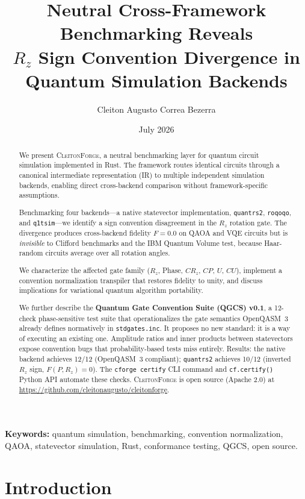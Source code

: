 \documentclass[11pt,a4paper]{article}
\title{\textbf{Neutral Cross-Framework Benchmarking Reveals\\
       $R_z$ Sign Convention Divergence in Quantum Simulation Backends}}
\author{Cleiton Augusto Correa Bezerra}
\affil{CleitonForge Project \\ \texttt{augusto.cleiton@gmail.com}}
\date{July 2026}
\begin{document}
\maketitle

\begin{abstract}
We present \textsc{CleitonForge}, a neutral benchmarking layer for quantum
circuit simulation implemented in Rust. The framework routes identical circuits
through a canonical intermediate representation (IR) to multiple independent
simulation backends, enabling direct cross-backend comparison without
framework-specific assumptions.

Benchmarking four backends---a native statevector implementation, \texttt{quantrs2},
\texttt{roqoqo}, and \texttt{q1tsim}---we identify a sign convention
disagreement in the $R_z$ rotation gate. The divergence produces
cross-backend fidelity $F = 0.0$ on QAOA and VQE circuits but is
\emph{invisible} to Clifford benchmarks and the IBM Quantum Volume test,
because Haar-random circuits average over all rotation angles.

We characterize the affected gate family ($R_z$, Phase, $CR_z$, $CP$, $U$,
$CU$), implement a convention normalization transpiler that restores fidelity
to unity, and discuss implications for variational quantum algorithm
portability.

We further describe the \textbf{Quantum Gate Convention Suite (QGCS) v0.1}, a
12-check phase-sensitive test suite that operationalizes the gate semantics
OpenQASM~3 already defines normatively in \texttt{stdgates.inc}. It proposes no
new standard: it is a way of executing an existing one. Amplitude ratios and
inner products between statevectors expose convention bugs that
probability-based tests miss entirely. Results:
the native backend achieves 12/12 (OpenQASM~3 compliant); \texttt{quantrs2}
achieves 10/12 (inverted $R_z$ sign, $F(P, R_z)=0$). The \texttt{cforge
certify} CLI command and \texttt{cf.certify()} Python API automate these checks.
\textsc{CleitonForge} is open source (Apache 2.0) at
\url{https://github.com/cleitonaugusto/cleitonforge}.
\end{abstract}

\textbf{Keywords:} quantum simulation, benchmarking, convention normalization,
QAOA, statevector simulation, Rust, conformance testing, QGCS, open source.

\section{Introduction}
\end{document}
